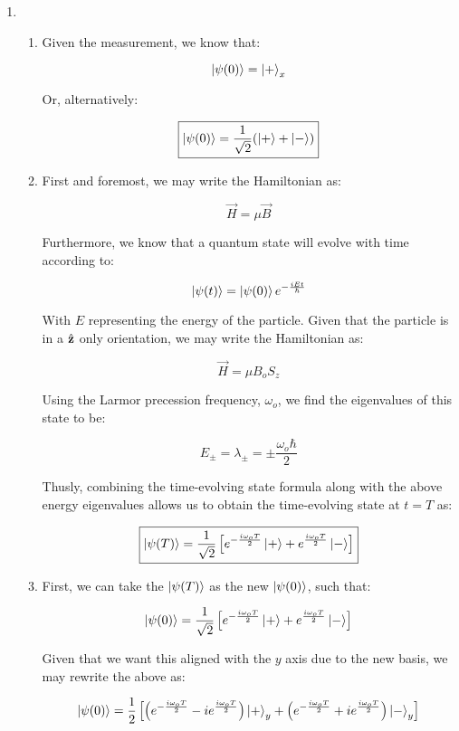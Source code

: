 \begin{enumerate}

  \item

    \begin{enumerate}

      \item Given the measurement, we know that:

        $$\ket{\psi(0)}=\ket{+}_x$$

        Or, alternatively:

        $$\boxed{\ket{\psi(0)}=\frac{1}{\sqrt{2}}(\ket{+}+\ket{-})}$$

      \item First and foremost, we may write the Hamiltonian as:

        $$\vec{H}=\mu\vec{B}$$

        Furthermore, we know that a quantum state will evolve with time according to:

        $$\ket{\psi(t)}=\ket{\psi(0)}e^{-\frac{iEt}{\hbar}}$$

        With $E$ representing the energy of the particle. Given that the particle is in a $\hat{\bold{z}}$ only orientation, we may write the Hamiltonian as:

        $$\vec{H}=\mu B_o S_z$$

        Using the Larmor precession frequency, $\omega_o$, we find the eigenvalues of this state to be:

        $$E_{\pm}=\lambda_{\pm}=\pm\frac{\omega_o\hbar}{2}$$

        Thusly, combining the time-evolving state formula along with the above energy eigenvalues allows us to obtain the time-evolving state  at $t=T$ as:

        $$\boxed{\ket{\psi(T)}=\frac{1}{\sqrt{2}}\left[e^{-\frac{i\omega_o T}{2}}\ket{+}+e^{\frac{i\omega_o T}{2}}\ket{-}\right]}$$

      \item First, we can take the $\ket{\psi(T)}$ as the new $\ket{\psi(0)}$, such that:

        $$\ket{\psi(0)}=\frac{1}{\sqrt{2}}\left[e^{-\frac{i\omega_o T}{2}}\ket{+}+e^{\frac{i\omega_o T}{2}}\ket{-}\right]$$

        Given that we want this aligned with the $y$ axis due to the new basis, we may rewrite the above as:

        $$\ket{\psi(0)}=\frac{1}{2}\left[\left(e^{-\frac{i\omega_o T}{2}}-ie^{\frac{i\omega_o T}{2}}\right)\ket{+}_y+\left(e^{-\frac{i\omega_o T}{2}}+ie^{\frac{i\omega_o T}{2}}\right)\ket{-}_y\right]$$


\end{enumerate}
\end{enumerate}
